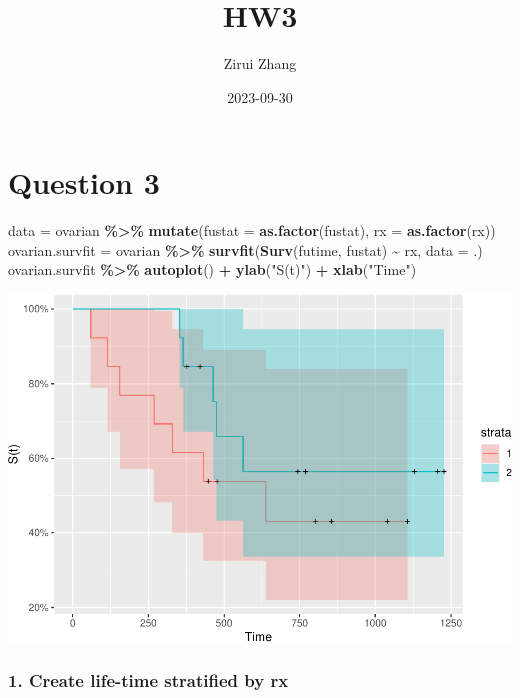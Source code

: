 \documentclass[
]{article}
\title{HW3}
\author{Zirui Zhang}
\date{2023-09-30}
\newenvironment{Shaded}{\begin{snugshade}}{\end{snugshade}}
\newcommand{\AttributeTok}[1]{\textcolor[rgb]{0.13,0.29,0.53}{#1}}
\newcommand{\FunctionTok}[1]{\textcolor[rgb]{0.13,0.29,0.53}{\textbf{#1}}}
\newcommand{\NormalTok}[1]{#1}
\newcommand{\OtherTok}[1]{\textcolor[rgb]{0.56,0.35,0.01}{#1}}
\newcommand{\SpecialCharTok}[1]{\textcolor[rgb]{0.81,0.36,0.00}{\textbf{#1}}}
\newcommand{\StringTok}[1]{\textcolor[rgb]{0.31,0.60,0.02}{#1}}
\begin{document}
\maketitle

\hypertarget{question-3}{%
\section{Question 3}\label{question-3}}

\begin{Shaded}
\begin{Highlighting}[]
\NormalTok{data }\OtherTok{=}\NormalTok{ ovarian }\SpecialCharTok{\%\textgreater{}\%} \FunctionTok{mutate}\NormalTok{(}\AttributeTok{fustat =} \FunctionTok{as.factor}\NormalTok{(fustat), }\AttributeTok{rx =} \FunctionTok{as.factor}\NormalTok{(rx))}
\NormalTok{ovarian.survfit }\OtherTok{=}\NormalTok{ ovarian }\SpecialCharTok{\%\textgreater{}\%} \FunctionTok{survfit}\NormalTok{(}\FunctionTok{Surv}\NormalTok{(futime, fustat) }\SpecialCharTok{\textasciitilde{}}\NormalTok{ rx, }\AttributeTok{data =}\NormalTok{ .)}
\NormalTok{ovarian.survfit }\SpecialCharTok{\%\textgreater{}\%} \FunctionTok{autoplot}\NormalTok{() }\SpecialCharTok{+} \FunctionTok{ylab}\NormalTok{(}\StringTok{"S(t)"}\NormalTok{) }\SpecialCharTok{+} \FunctionTok{xlab}\NormalTok{(}\StringTok{"Time"}\NormalTok{)}
\end{Highlighting}
\end{Shaded}

\includegraphics{HW3_files/figure-latex/unnamed-chunk-1-1.pdf}

\hypertarget{create-life-time-stratified-by-rx}{%
\subsubsection{1. Create life-time stratified by
rx}\label{create-life-time-stratified-by-rx}}
\end{document}
